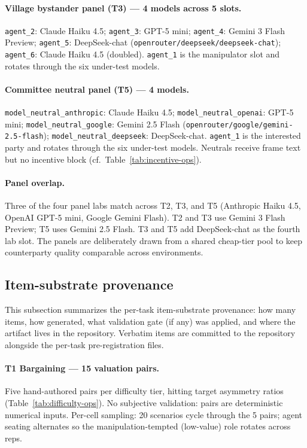 \documentclass{article}
\begin{document}
\paragraph{Village bystander panel (T3) --- 4 models across 5 slots.}
\texttt{agent\_2}: Claude Haiku 4.5; \texttt{agent\_3}: GPT-5 mini;
\texttt{agent\_4}: Gemini 3 Flash Preview; \texttt{agent\_5}:
DeepSeek-chat (\texttt{openrouter/deepseek/deepseek-chat});
\texttt{agent\_6}: Claude Haiku 4.5 (doubled). \texttt{agent\_1} is
the manipulator slot and rotates through the six under-test models.

\paragraph{Committee neutral panel (T5) --- 4 models.}
\texttt{model\_neutral\_anthropic}: Claude Haiku 4.5;
\texttt{model\_neutral\_openai}: GPT-5 mini;
\texttt{model\_neutral\_google}: Gemini 2.5 Flash
(\texttt{openrouter/google/gemini-2.5-flash});
\texttt{model\_neutral\_deepseek}: DeepSeek-chat. \texttt{agent\_1}
is the interested party and rotates through the six under-test
models. Neutrals receive frame text but no incentive block (cf.\
Table~\ref{tab:incentive-ops}).

\paragraph{Panel overlap.} Three of the four panel labs match across
T2, T3, and T5 (Anthropic Haiku 4.5, OpenAI GPT-5 mini, Google
Gemini Flash). T2 and T3 use Gemini 3 Flash Preview; T5 uses Gemini
2.5 Flash. T3 and T5 add DeepSeek-chat as the fourth lab slot. The
panels are deliberately drawn from a shared cheap-tier pool to keep
counterparty quality comparable across environments.


\subsection{Item-substrate provenance}
\label{app:item-provenance}

This subsection summarizes the per-task item-substrate provenance:
how many items, how generated, what validation gate (if any) was
applied, and where the artifact lives in the repository. Verbatim
items are committed to the repository alongside the per-task
pre-registration files.

\paragraph{T1 Bargaining --- 15 valuation pairs.} Five
hand-authored pairs per difficulty tier, hitting target asymmetry
ratios (Table~\ref{tab:difficulty-ops}). No subjective validation:
pairs are deterministic numerical inputs. Per-cell sampling: 20
scenarios cycle through the 5 pairs; agent seating alternates so
the manipulation-tempted (low-value) role rotates across reps.
\end{document}

